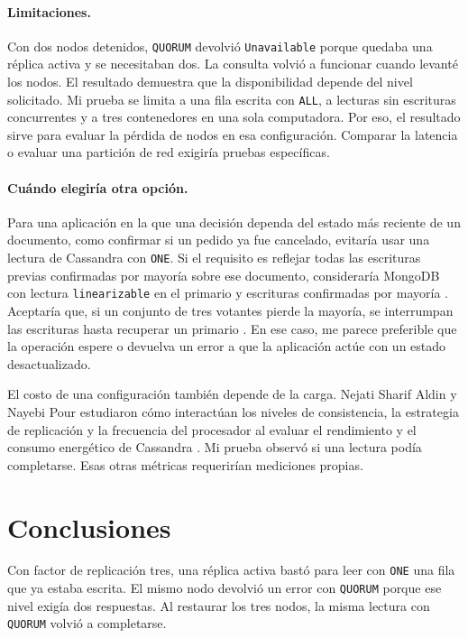 \documentclass[11pt,a4paper]{article}
\begin{document}
\paragraph{Limitaciones.} Con dos nodos detenidos, \texttt{QUORUM} devolvió \texttt{Unavailable} porque quedaba una réplica activa y se necesitaban dos. La consulta volvió a funcionar cuando levanté los nodos. El resultado demuestra que la disponibilidad depende del nivel solicitado. Mi prueba se limita a una fila escrita con \texttt{ALL}, a lecturas sin escrituras concurrentes y a tres contenedores en una sola computadora. Por eso, el resultado sirve para evaluar la pérdida de nodos en esa configuración. Comparar la latencia o evaluar una partición de red exigiría pruebas específicas.

\paragraph{Cuándo elegiría otra opción.} Para una aplicación en la que una decisión dependa del estado más reciente de un documento, como confirmar si un pedido ya fue cancelado, evitaría usar una lectura de Cassandra con \texttt{ONE}. Si el requisito es reflejar todas las escrituras previas confirmadas por mayoría sobre ese documento, consideraría MongoDB con lectura \texttt{linearizable} en el primario y escrituras confirmadas por mayoría \cite{mongodb8linearizable}. Aceptaría que, si un conjunto de tres votantes pierde la mayoría, se interrumpan las escrituras hasta recuperar un primario \cite{mongodb8elections}. En ese caso, me parece preferible que la operación espere o devuelva un error a que la aplicación actúe con un estado desactualizado.

El costo de una configuración también depende de la carga. Nejati Sharif Aldin y Nayebi Pour estudiaron cómo interactúan los niveles de consistencia, la estrategia de replicación y la frecuencia del procesador al evaluar el rendimiento y el consumo energético de Cassandra \cite{nejati2026cassandra}. Mi prueba observó si una lectura podía completarse. Esas otras métricas requerirían mediciones propias.

\section{Conclusiones}
Con factor de replicación tres, una réplica activa bastó para leer con \texttt{ONE} una fila que ya estaba escrita. El mismo nodo devolvió un error con \texttt{QUORUM} porque ese nivel exigía dos respuestas. Al restaurar los tres nodos, la misma lectura con \texttt{QUORUM} volvió a completarse.
\end{document}
